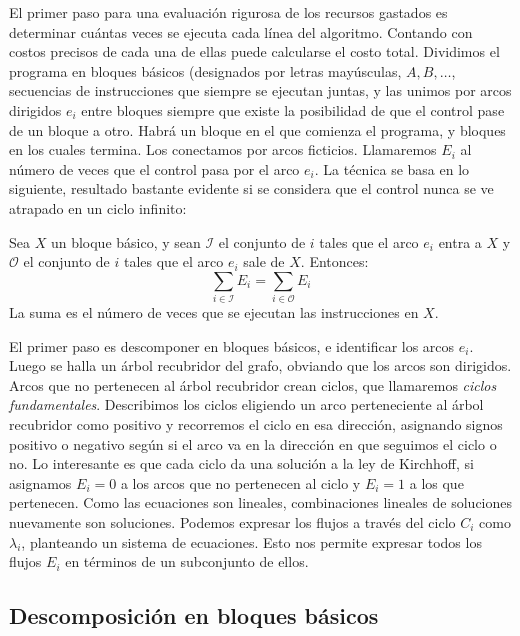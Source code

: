   El primer paso para una evaluación rigurosa de los recursos gastados
  es determinar cuántas veces se ejecuta cada línea del algoritmo.
  Contando con costos precisos de cada una de ellas
  puede calcularse el costo total.
  Dividimos el programa en bloques básicos
  (designados por letras mayúsculas, \(A, B, \dotsc\),
  secuencias de instrucciones que siempre se ejecutan juntas,
  y las unimos por arcos dirigidos \(e_i\) entre bloques
  siempre que existe la posibilidad de que el control pase de un bloque a otro.
  Habrá un bloque en el que comienza el programa,
  y bloques en los cuales termina.
  Los conectamos por arcos ficticios.
  Llamaremos \(E_i\) al número de veces
  que el control pasa por el arco \(e_i\).
  La técnica se basa en lo siguiente,
  resultado bastante evidente si se considera que el control
  nunca se ve atrapado en un ciclo infinito:
  \begin{theorem}
    \label{theo:Kirchhoff}
    Sea \(X\) un bloque básico,
    y sean \(\mathscr{I}\) el conjunto de \(i\) tales que el arco \(e_i\)
    entra a \(X\)
    y \(\mathscr{O}\) el conjunto de \(i\) tales que el arco \(e_i\)
    sale de \(X\).
    Entonces:
    \begin{equation*}
      \sum_{i \in \mathscr{I}} E_i
        = \sum_{i \in \mathscr{O}} E_i
    \end{equation*}
    La suma es el número de veces que se ejecutan las instrucciones en \(X\).
  \end{theorem}
  El primer paso es descomponer en bloques básicos,
  e identificar los arcos \(e_i\).
  Luego se halla un árbol recubridor del grafo,
  obviando que los arcos son dirigidos.
  Arcos que no pertenecen al árbol recubridor crean ciclos,
  que llamaremos \emph{ciclos fundamentales}.
  Describimos los ciclos eligiendo un arco perteneciente al árbol recubridor
  como positivo y recorremos el ciclo en esa dirección,
  asignando signos positivo o negativo según si el arco
  va en la dirección en que seguimos el ciclo o no.
  Lo interesante es que cada ciclo da una solución a la ley de Kirchhoff,
  si asignamos \(E_i = 0\) a los arcos que no pertenecen al ciclo
  y \(E_i = 1\) a los que pertenecen.
  Como las ecuaciones son lineales,
  combinaciones lineales de soluciones nuevamente son soluciones.
  Podemos expresar los flujos a través del ciclo \(C_i\) como \(\lambda_i\),
  planteando un sistema de ecuaciones.
  Esto nos permite expresar todos los flujos \(E_i\)
  en términos de un subconjunto de ellos.

\subsection{Descomposición en bloques básicos}
\label{sec:bloques-basicos}

